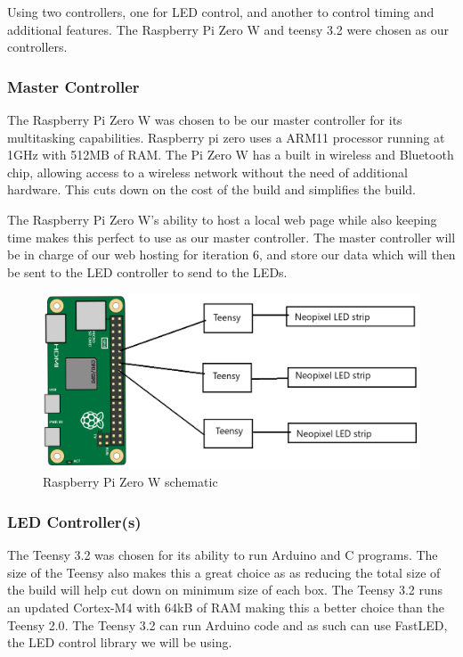 \documentclass[onecolumn, draftclsnofoot,10pt, compsoc]{IEEEtran}
\begin{document}
			\noindent Using two controllers, one for LED control, and another to control timing
			and additional features. The Raspberry Pi Zero W and teensy 3.2 were chosen
			as our controllers.
			\subsubsection{Master Controller}
			\noindent The Raspberry Pi Zero W was chosen to be our master controller for its
			multitasking capabilities. Raspberry pi zero uses a ARM11 processor
			running at 1GHz with 512MB of RAM\cite{pizero}. The Pi Zero W has a built in wireless and
			Bluetooth chip, allowing access to a wireless network without the need
			of additional hardware. This cuts down on the cost of the build and
			simplifies the build.

			\noindent The Raspberry Pi Zero W's ability to host a local web page while also
			keeping time makes this perfect to use as our master controller. The
			master controller will be in charge of our web hosting for iteration 6,
			and store our data which will then be sent to the LED controller to send
			to the LEDs.
			\begin{center}
				\begin{figure}[H]
					\includegraphics[width=\linewidth]{systemDiagrams/pischem.png}
					\caption{Raspberry Pi Zero W schematic}
					\label{fig:piSchematic}
				\end{figure}
			\end{center}
			\subsubsection{LED Controller(s)}
			\noindent The Teensy 3.2 was chosen for its ability to run Arduino and C programs.
			The size of the Teensy also makes this a great choice as as reducing the
			total size of the build will help cut down on minimum size of each box.
			The Teensy 3.2 runs an updated Cortex-M4 with 64kB of RAM making this a
			better choice than the Teensy 2.0\cite{atmel}. The Teensy 3.2 can run Arduino code and as such can use FastLED, the LED
			control library we will be using.
\end{document}
